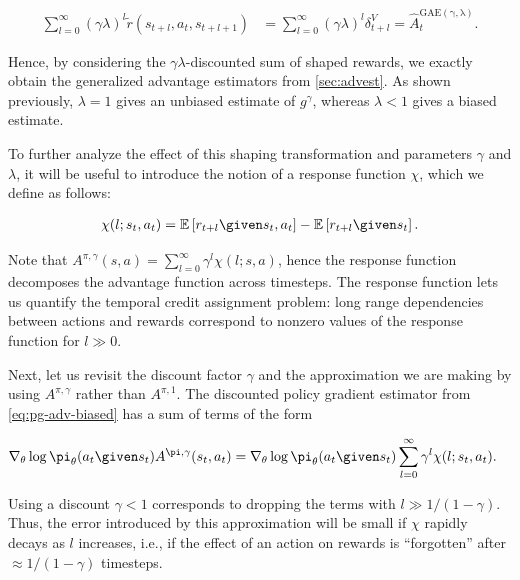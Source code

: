 \begin{align}
\sum_{l=0}^{\infty} (\gamma \lambda)^{l}\tilde{r}(s_{t+l},a_t,s_{t+l+1}) &= \sum_{l=0}^{\infty} (\gamma \lambda)^{l} \delta^V_{t+l}
= \hat{A}^{\mathrm{GAE(\gamma,\lambda)}}_t.
\end{align}

Hence, by considering the $\gamma\lambda$-discounted sum of shaped rewards, we exactly obtain the generalized advantage estimators from \ref{sec:advest}.
As shown previously, $\lambda=1$ gives an unbiased estimate of $g^{\gamma}$, whereas $\lambda<1$ gives a biased estimate.

To further analyze the effect of this shaping transformation and parameters $\gamma$ and $\lambda$, it will be useful to introduce the notion of a response function $\chi$, which we define as follows:

\begin{align}
\chi(l; s_t, a_t) = \mathbb{E}\left[r_{t+l} \given s_t, a_t\right]  - \mathbb{E}\left[r_{t+l} \given s_t\right].
\end{align}

Note that $A^{\pi,\gamma}(s,a) = \sum_{l=0}^{\infty} \gamma^{l} \chi(l; s, a)$, hence the response function decomposes the advantage function across timesteps. The response function lets us quantify the temporal credit assignment problem: long range dependencies between actions and rewards correspond to nonzero values of the response function for $l \gg 0$.

Next, let us revisit the discount factor $\gamma$ and the approximation we are making by using $A^{\pi,\gamma}$ rather than $A^{\pi,1}$.
The discounted policy gradient estimator from \ref{eq:pg-adv-biased} has a sum of terms of the form

\begin{align}
\nabla_{\theta} \log \pi_{\theta}(a_t \given s_t) A^{\pi,\gamma}(s_t, a_t) &= \nabla_{\theta} \log \pi_{\theta}(a_t \given s_t) \sum_{l=0}^{\infty} \gamma^{l} \chi(l; s_t,a_t) .
\end{align}

Using a discount $\gamma < 1$ corresponds to dropping the terms with $l \gg 1/(1-\gamma)$.
Thus, the error introduced by this approximation will be small if $\chi$ rapidly decays as $l$ increases, i.e., if the effect of an action on rewards is ``forgotten'' after $\approx 1/(1-\gamma)$ timesteps.

